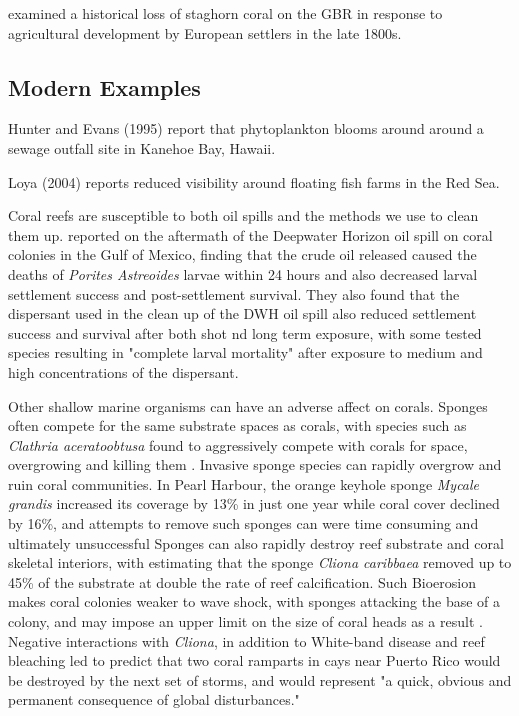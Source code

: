\documentclass[11pt,a4paper]{article}
\begin{document}
\cite{Roff2013} examined a historical loss of staghorn coral on the GBR in response to agricultural development by European settlers in the late 1800s. 


\subsection{Modern Examples}

Hunter and Evans (1995) report that phytoplankton blooms around around a sewage outfall site in Kanehoe Bay, Hawaii.

Loya (2004) reports reduced visibility around floating fish farms in the Red Sea.

Coral reefs are susceptible to both oil spills and the methods we use to clean them up. \cite{Goodbody2013} reported on the aftermath of the Deepwater Horizon oil spill on coral colonies in the Gulf of Mexico, finding that the crude oil released caused the deaths of \textit{Porites Astreoides} larvae within 24 hours and also decreased larval settlement success and post-settlement survival. They also found that the dispersant used in the clean up of the DWH oil spill also reduced settlement success and survival after both shot nd long term exposure, with some tested species resulting in "complete larval mortality" after exposure to medium and high concentrations of the dispersant.

Other shallow marine organisms can have an adverse affect on corals. Sponges often compete for the same substrate spaces as corals, with species such as \textit{Clathria aceratoobtusa} found to aggressively compete with corals for space, overgrowing and killing them \citep{Ashok2020}. 
Invasive sponge species can rapidly overgrow and ruin coral communities. In Pearl Harbour, the orange keyhole sponge \textit{Mycale grandis} increased its coverage by 13\% in just one year while coral cover declined by 16\%, and attempts to remove such sponges can were time consuming and ultimately unsuccessful \citep{Coles2007}
 Sponges can also rapidly destroy reef substrate and coral skeletal interiors, with \cite{Acker1985} estimating that the sponge \textit{Cliona caribbaea} removed up to 45\% of the substrate at double the rate of reef calcification. Such Bioerosion makes coral colonies weaker to wave shock, with sponges attacking the base of a colony, and may impose an upper limit on the size of coral heads as a result \citep{Hein1975}.
 Negative interactions with \textit{Cliona}, in addition to White-band disease and reef bleaching led \cite{Williams1999} to predict that two coral ramparts in cays near Puerto Rico would be destroyed by the next set of storms, and would represent "a quick, obvious and permanent consequence of global disturbances." %
\end{document}
